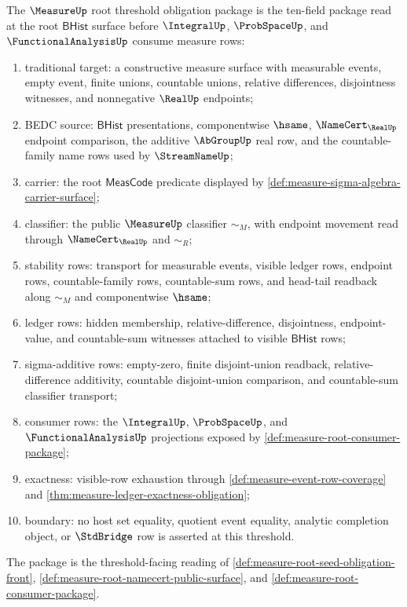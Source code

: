 \begin{definition}
\label{def:measure-root-threshold-obligation-package}
The $\MeasureUp$ root threshold obligation package is the ten-field package
read at the root $\mathsf{BHist}$ surface before $\IntegralUp$,
$\ProbSpaceUp$, and $\FunctionalAnalysisUp$ consume measure rows:
\begin{enumerate}
  \item traditional target: a constructive measure surface with measurable
  events, empty event, finite unions, countable unions, relative differences,
  disjointness witnesses, and nonnegative $\RealUp$ endpoints;
  \item BEDC source: $\mathsf{BHist}$ presentations, componentwise $\hsame$,
  $\NameCert_{\RealUp}$ endpoint comparison, the additive $\AbGroupUp$ real
  row, and the countable-family name rows used by $\StreamNameUp$;
  \item carrier: the root $\mathsf{MeasCode}$ predicate displayed by
  \autoref{def:measure-sigma-algebra-carrier-surface};
  \item classifier: the public $\MeasureUp$ classifier $\sim_M$, with
  endpoint movement read through $\NameCert_{\RealUp}$ and $\sim_R$;
  \item stability rows: transport for measurable events, visible ledger rows,
  endpoint rows, countable-family rows, countable-sum rows, and head-tail
  readback along $\sim_M$ and componentwise $\hsame$;
  \item ledger rows: hidden membership, relative-difference, disjointness,
  endpoint-value, and countable-sum witnesses attached to visible
  $\mathsf{BHist}$ rows;
  \item sigma-additive rows: empty-zero, finite disjoint-union readback,
  relative-difference additivity, countable disjoint-union comparison, and
  countable-sum classifier transport;
  \item consumer rows: the $\IntegralUp$, $\ProbSpaceUp$, and
  $\FunctionalAnalysisUp$ projections exposed by
  \autoref{def:measure-root-consumer-package};
  \item exactness: visible-row exhaustion through
  \autoref{def:measure-event-row-coverage} and
  \autoref{thm:measure-ledger-exactness-obligation};
  \item boundary: no host set equality, quotient event equality, analytic
  completion object, or $\StdBridge$ row is asserted at this threshold.
\end{enumerate}
The package is the threshold-facing reading of
\autoref{def:measure-root-seed-obligation-front},
\autoref{def:measure-root-namecert-public-surface}, and
\autoref{def:measure-root-consumer-package}.
\end{definition}

